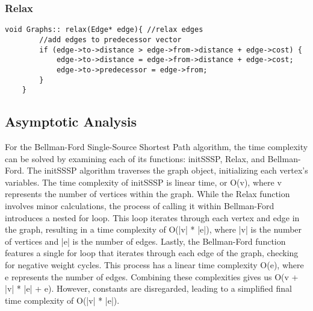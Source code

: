 \documentclass[letterpaper, 10pt,DIV=13]{scrartcl}
\numberwithin{equation}{section} %
\numberwithin{figure}{section} %
\numberwithin{table}{section} %
\begin{document}
\pagebreak

\subsubsection*{Relax}
    \lstset{numbers=left, numberstyle=\tiny, stepnumber=1, numbersep=5pt, basicstyle=\footnotesize\ttfamily}
    \begin{lstlisting}[frame=single, ]
    void Graphs:: relax(Edge* edge){ //relax edges
        //add edges to predecessor vector
        if (edge->to->distance > edge->from->distance + edge->cost) {
            edge->to->distance = edge->from->distance + edge->cost;
            edge->to->predecessor = edge->from;
        }
    }
\end{lstlisting}

\subsection{Asymptotic Analysis}
For the Bellman-Ford Single-Source Shortest Path algorithm, the time complexity can be solved by examining each of its functions: initSSSP, Relax, and Bellman-Ford. The initSSSP algorithm traverses the graph object, initializing each vertex's variables. The time complexity of initSSSP is linear time, or O(v), where v represents the number of vertices within the graph. While the Relax function involves minor calculations, the process of calling it within Bellman-Ford introduces a nested for loop. This loop iterates through each vertex and edge in the graph, resulting in a time complexity of O(|v| * |e|), where |v| is the number of vertices and |e| is the number of edges. Lastly, the Bellman-Ford function features a single for loop that iterates through each edge of the graph, checking for negative weight cycles. This process has a linear time complexity O(e), where e represents the number of edges. Combining these complexities gives us O(v + |v| * |e| + e). However, constants are disregarded, leading to a simplified final time complexity of O(|v| * |e|).




\end{document}
